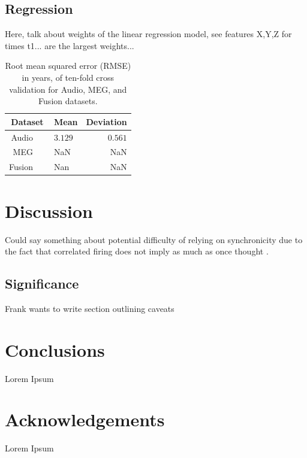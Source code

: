 \documentclass[a4paper]{article}
\begin{document}
\subsection{Regression}

Here, talk about weights of the linear regression model, see features X,Y,Z for times t1... are the largest weights...

\begin{table}[t]
  \caption{Root mean squared error (RMSE) in years, of ten-fold cross validation for Audio, MEG, and Fusion datasets.}
  \label{tab:xvalreg}
  \centering
  \begin{tabular}{ r@{}l  r }
    \toprule
    \multicolumn{1}{c}{\textbf{Dataset}} & \multicolumn{1}{c}{\textbf{Mean}} & \multicolumn{1}{c}{\textbf{Deviation}} \\
    \midrule
    Audio~~~                        & $3.129$         &     $0.561$   \\
    MEG~~~                          & NaN             &      NaN      \\
    Fusion~~~                       & Nan             &      NaN      \\
    \bottomrule
  \end{tabular}
\end{table}

\section{Discussion}

Could say something about potential difficulty of relying on synchronicity due to the fact that correlated firing does not imply as much as once thought \cite{Moreno-Bote2014}. 

\subsection{Significance}

Frank wants to write section outlining caveats

\section{Conclusions}

Lorem Ipsum

\section{Acknowledgements}

Lorem Ipsum





\end{document}
